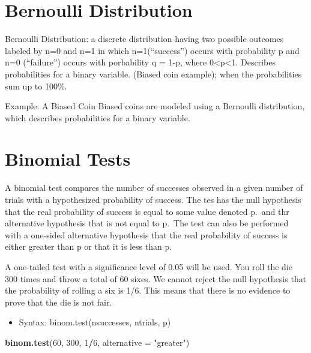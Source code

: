 \documentclass[]{article}
\newenvironment{Shaded}{\begin{snugshade}}{\end{snugshade}}
\newcommand{\DataTypeTok}[1]{\textcolor[rgb]{0.13,0.29,0.53}{#1}}
\newcommand{\DecValTok}[1]{\textcolor[rgb]{0.00,0.00,0.81}{#1}}
\newcommand{\KeywordTok}[1]{\textcolor[rgb]{0.13,0.29,0.53}{\textbf{#1}}}
\newcommand{\NormalTok}[1]{#1}
\newcommand{\OperatorTok}[1]{\textcolor[rgb]{0.81,0.36,0.00}{\textbf{#1}}}
\newcommand{\StringTok}[1]{\textcolor[rgb]{0.31,0.60,0.02}{#1}}
\providecommand{\tightlist}{%
  \setlength{\itemsep}{0pt}\setlength{\parskip}{0pt}}
\begin{document}
\hypertarget{bernoulli-distribution}{%
\section{Bernoulli Distribution}\label{bernoulli-distribution}}

Bernoulli Distribution: a discrete distribution having two possible
outcomes labeled by n=0 and n=1 in which n=1(``success'') occurs with
probability p and n=0 (``failure'') occurs with porbability q = 1-p,
where 0\textless{}p\textless{}1. Describes probabilities for a binary
variable. (Biased coin example); when the probabilities sum up to 100\%.

Example: A Biased Coin Biased coins are modeled using a Bernoulli
distribution, which describes probabilities for a binary variable.

\hypertarget{binomial-tests}{%
\section{Binomial Tests}\label{binomial-tests}}

A binomial test compares the number of successes observed in a given
number of trials with a hypothesized probability of success. The tes has
the null hypothesis that the real probability of success is equal to
some value denoted p.~and thr alternative hypothesis that is not equal
to p.~The test can also be performed with a one-sided alternative
hypothesis that the real probability of success is either greater than p
or that it is less than p.

A one-tailed test with a significance level of 0.05 will be used. You
roll the die 300 times and throw a total of 60 sixes. We cannot reject
the null hypothesis that the probability of rolling a six is 1/6. This
means that there is no evidence to prove that the die is not fair.

\begin{itemize}
\tightlist
\item
  Syntax: binom.test(nsuccesses, ntrials, p)
\end{itemize}

\begin{Shaded}
\begin{Highlighting}[]
\KeywordTok{binom.test}\NormalTok{(}\DecValTok{60}\NormalTok{, }\DecValTok{300}\NormalTok{, }\DecValTok{1}\OperatorTok{/}\DecValTok{6}\NormalTok{, }\DataTypeTok{alternative =} \StringTok{"greater"}\NormalTok{)}
\end{Highlighting}
\end{Shaded}
\end{document}
